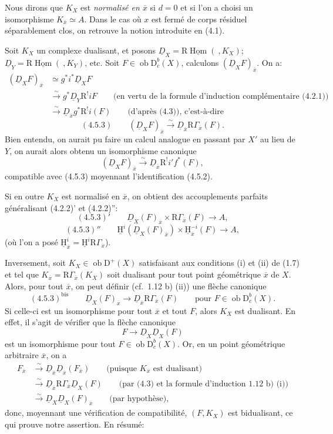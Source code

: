 \documentclass[11pt]{article}
\providecommand{\uH}{\underline{\mathrm H}}
\DeclareMathOperator{\Hom}{Hom}
\newcommand{\R}{\mathrm{R}}\newcommand{\RHomCore}{\mathrm{RHom}}
\newcommand{\D}{\mathrm{D}}
\newcommand{\ob}{\operatorname{ob}}
\newcommand{\ol}[1]{\overline{#1}}
\providecommand{\Hom}{\operatorname{Hom}}
\providecommand{\ob}{\operatorname{ob}}
\providecommand{\R}{\mathrm R}
\providecommand{\Hom}{\operatorname{Hom}}
\begin{document}
Nous dirons que $K_X$ est \emph{normalisé en $\ol{x}$} si $d=0$ et si l'on a choisi un isomorphisme $K_{\ol{x}}\simeq A$. Dans le cas où $x$ est fermé de corps résiduel séparablement clos, on retrouve la notion introduite en (4.1).

Soit $K_X$ un complexe dualisant, et posons $\underline{D}_X=\R\underline{\Hom}(\ ,K_X)$; $\underline{D}_Y=\R\underline{\Hom}(\ ,K_Y)$, etc. Soit $F\in\ob\D_c^b(X)$, calculons $(\underline{D}_XF)_{\ol{x}}$. On a:
\[
\begin{aligned}
(\underline{D}_XF)_{\ol{x}}&\simeq g^*i^*\underline{D}_X F\\
&\xrightarrow{\sim}g^*\underline{D}_Y\R^{!}iF\qquad\text{(en vertu de la formule d'induction complémentaire (4.2.1))}\\
&\xrightarrow{\sim}\underline{D}_{\ol{x}}g^*\R^{!}i(F)\qquad\text{(d'après (4.3)), c'est-à-dire}
\end{aligned}
\]
\[
(4.5.3)\qquad (\underline{D}_X F)_{\ol{x}}\xrightarrow{\sim}\underline{D}_{\ol{x}}\R\Gamma_{\ol{x}}(F).
\]
Bien entendu, on aurait pu faire un calcul analogue en passant par 
$X'$ au
lieu de $Y$, on aurait alors obtenu un isomorphisme canonique
\[
(\underline{D}_XF)_{\ol{x}}\xrightarrow{\sim}\underline{D}_{\ol{x}}\R^{!}i'f^*(F),
\]
compatible avec (4.5.3) moyennant l'identification (4.5.2).

Si en outre $K_X$ est normalisé en $\ol{x}$, on obtient des accouplements parfaits généralisant (4.2.2)' et (4.2.2)'':
\[
(4.5.3)'\qquad \underline{D}_X(F)_{\ol{x}}\times \R\Gamma_{\ol{x}}(F)\longrightarrow A,
\]
\[
(4.5.3)''\qquad \uH^i(\underline{D}_X(F)_{\ol{x}})\times \uH_{\ol{x}}^{-i}(F)\longrightarrow A,
\]
(où l'on a posé $\uH_{\ol{x}}^i=\uH^i\R\Gamma_{\ol{x}}$).

Inversement, soit $K_X\in\ob\D^+(X)$ satisfaisant aux conditions (i) et (ii) de (1.7) et tel que $K_{\ol{x}}=\R\Gamma_{\ol{x}}(K_X)$ soit dualisant pour tout point géométrique $\ol{x}$ de $X$. Alors, pour tout $\ol{x}$, on peut définir (cf.~1.12 b) (ii)) une flèche canonique
\[
(4.5.3)^{\mathrm{bis}}\qquad \underline{D}_X(F)_{\ol{x}}\longrightarrow \underline{D}_{\ol{x}}\R\Gamma_{\ol{x}}(F)\qquad \text{pour } F\in\ob\D_c^b(X).
\]
Si celle-ci est un isomorphisme pour tout $\ol{x}$ et tout $F$, alors $K_X$ est dualisant. En effet, il s'agit de vérifier que la flèche canonique
\[
F\longrightarrow \underline{D}_X\underline{D}_X(F)
\]
est un isomorphisme pour tout $F\in\ob\D_c^b(X)$. Or, en un point géométrique arbitraire $\ol{x}$, on a
\[
\begin{aligned}
F_{\ol{x}}&\xrightarrow{\sim}\underline{D}_{\ol{x}}\underline{D}_{\ol{x}}(F_{\ol{x}})\qquad\text{(puisque $K_{\ol{x}}$ est dualisant)}\\
&\xrightarrow{\sim}\underline{D}_{\ol{x}}\R\Gamma_{\ol{x}}\underline{D}_X(F)\qquad\text{(par (4.3) et la formule d'induction 1.12 b) (i))}\\
&\xrightarrow{\sim}\underline{D}_X\underline{D}_X(F)_{\ol{x}}\qquad\text{(par hypothèse)},
\end{aligned}
\]
donc, moyennant une vérification de compatibilité, $(F,K_X)$ est bidualisant, ce qui prouve notre assertion. En résumé:
\end{document}
